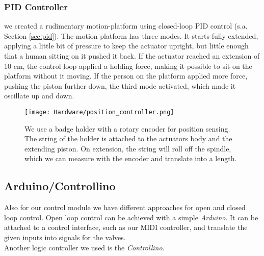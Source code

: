 \subsubsection{PID Controller}
we created a rudimentary motion-platform using closed-loop PID control (s.a. Section \ref{sec:pid}). The motion platform has three modes. It starts fully extended, applying a little bit of pressure to keep the actuator upright, but little enough that a human sitting on it pushed it back. If the actuator reached an extension of 10 cm, the control loop applied a holding force, making it possible to sit on the platform without it moving. If the person on the platform applied more force, pushing the piston further down, the third mode activated, which made it oscillate up and down.

\begin{figure}[ht!]
    \texttt{[image: Hardware/position\_controller.png]}
    \centering
    \caption{We use a badge holder with a rotary encoder for position sensing. The string of the holder is attached to the actuators body and the extending piston. On extension, the string will roll off the spindle, which we can measure with the encoder and translate into a length.}
    \label{fig:position_control}
\end{figure}

\subsection{Arduino/Controllino}
Also for our control module we have different approaches for open and closed loop control. Open loop control can be achieved with a simple \textit{Arduino}. It can be attached to a control interface, such as our MIDI controller, and translate the given inputs into signals for the valves.\\
Another logic controller we used is the \textit{Controllino}.
